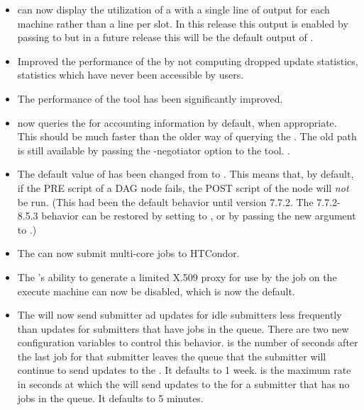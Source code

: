 \begin{itemize}

\item {} can now display the utilization of a  with
a single line of output for each machine rather than a line per slot.
In this release this output is enabled by passing  to 
but in a future release this will be the default output of .

\item Improved the performance of the  by
not computing dropped update statistics, statistics which 
have never been accessible by users.

\item The performance of the  tool has been
significantly improved.

\item {} now queries the  for 
accounting information by default, when appropriate.  This should be
much faster than the older way of querying the . The
old path is still available by passing the -negotiator option to the
tool.
.

\item The default value of  has been
changed from  to .  This means that, by
default, if the PRE script of a DAG node fails, the POST script
of the node will \emph{not} be run.  (This had been the default
behavior until version 7.7.2.  The 7.7.2-8.5.3 behavior can be
restored by setting  to 
, or by passing the new 
argument to .)

\item The  can now submit multi-core jobs to HTCondor.

\item The 's ability to generate a limited X.509 proxy
for use by the job on the execute machine can now be disabled, which is now
the default.

\item The  will now send submitter ad updates for idle submitters
less frequently than updates for submitters that have jobs in the queue. There
are two new configuration variables to control this behavior.
 is the number of seconds after the last
job for that submitter leaves the queue that the submitter will continue to
send updates to the .  It defaults to 1 week.
 is the maximum rate in seconds at which
the  will send updates to the  for a submitter
that has no jobs in the queue. It defaults to 5 minutes. 

\end{itemize}

